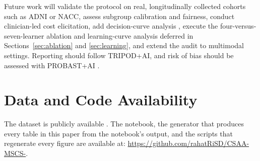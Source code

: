 \documentclass[conference]{IEEEtran}
\begin{document}
Future work will validate the protocol on real, longitudinally collected cohorts such as ADNI or NACC, assess subgroup calibration and fairness, conduct clinician-led cost elicitation, add decision-curve analysis \cite{b33}, execute the four-versus-seven-learner ablation and learning-curve analysis deferred in Sections~\ref{sec:ablation} and \ref{sec:learning}, and extend the audit to multimodal settings. Reporting should follow TRIPOD+AI, and risk of bias should be assessed with PROBAST+AI \cite{b34,b35}.

\section*{Data and Code Availability}
The dataset is publicly available \cite{b13,b14}. The notebook, the generator that produces every table in this paper from the notebook's output, and the scripts that regenerate every figure are available at: \url{https://github.com/rahatRiSD/CSAA-MSCS-}.
\end{document}
